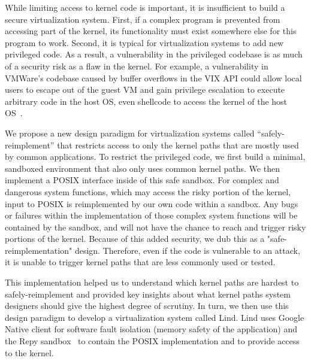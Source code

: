 While limiting access to kernel code is important, it is
insufficient to build a secure virtualization system.  First, if a complex
program is prevented from accessing part of the kernel, its functionality 
must exist somewhere else for this program to work.  Second, it is 
typical for virtualization systems to add new privileged code.
As a result, a vulnerability in the privileged codebase is as much of a security 
risk as a flaw in the kernel.  %
For example, 
a vulnerability in VMWare's codebase caused by buffer overflows in the VIX
API could allow local users to escape out of the guest VM and 
gain privilege escalation to execute arbitrary code in the host
OS, even shellcode to access the kernel of the host OS~\cite{CVE-2008-2100}.  

We propose a new design paradigm for virtualization 
systems called ``safely-reimplement'' that restricts access to only the
kernel paths that are mostly used by common applications.  To restrict the privileged
code, we first build a minimal, sandboxed environment that also only uses 
common kernel paths.
We then implement a POSIX interface inside of this safe sandbox. For complex and dangerous system functions, which may access the risky portion of the kernel, 
input to POSIX is reimplemented by our own code within a sandbox. Any bugs or failures within the implementation of those complex system functions 
will be contained by the sandbox, and will not have the chance to reach 
and trigger risky portions of the kernel. Because of this added security, we dub this as a "safe-reimplementation" design.  Therefore, even if the code
is vulnerable to an attack, it is unable to trigger
kernel paths that are less commonly used or tested.

This implementation helped us to understand which kernel paths are hardest to
safely-reimplement and provided key insights about what kernel paths system
designers should give the highest degree of scrutiny. In turn, we then use this design paradigm to develop a virtualization system called
Lind.  Lind uses Google Native client for software fault isolation (memory
safety of the application) and the Repy sandbox~\cite{Repy-10} to contain the POSIX
implementation and to provide access to the kernel.   

